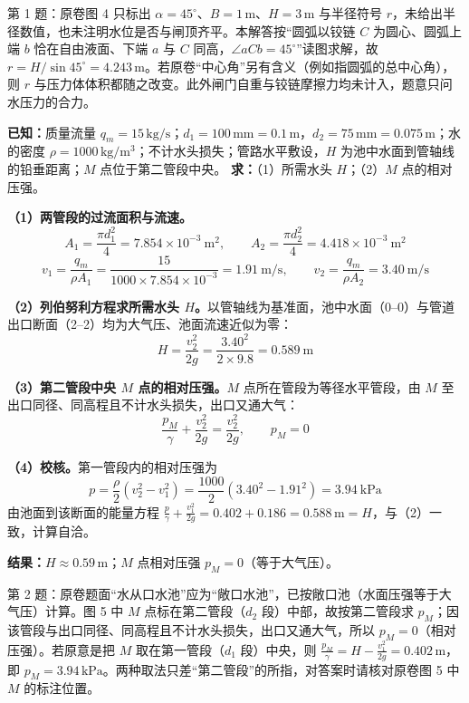 \begin{tishi}
第 1 题：原卷图 4 只标出 $\alpha=45^\circ$、$B=1\,\mathrm{m}$、$H=3\,\mathrm{m}$ 与半径符号 $r$，未给出半径数值，也未注明水位是否与闸顶齐平。本解答按“圆弧以铰链 $C$ 为圆心、圆弧上端 $b$ 恰在自由液面、下端 $a$ 与 $C$ 同高，$\angle aCb=45^\circ$”读图求解，故 $r=H/\sin45^\circ=4.243\,\mathrm{m}$。若原卷“中心角”另有含义（例如指圆弧的总中心角），则 $r$ 与压力体体积都随之改变。此外闸门自重与铰链摩擦力均未计入，题意只问水压力的合力。
\end{tishi}


\begin{jie}
\textbf{已知：}质量流量 $q_m=15\,\mathrm{kg/s}$；$d_1=100\,\mathrm{mm}=0.1\,\mathrm{m}$，$d_2=75\,\mathrm{mm}=0.075\,\mathrm{m}$；水的密度 $\rho=1000\,\mathrm{kg/m^3}$；不计水头损失；管路水平敷设，$H$ 为池中水面到管轴线的铅垂距离；$M$ 点位于第二管段中央。
\textbf{求：}（1）所需水头 $H$；（2）$M$ 点的相对压强。

\textbf{（1）两管段的过流面积与流速。}
\[
A_1=\frac{\pi d_1^2}{4}=7.854\times10^{-3}\ \mathrm{m^2},\qquad A_2=\frac{\pi d_2^2}{4}=4.418\times10^{-3}\ \mathrm{m^2}
\]
\[
v_1=\frac{q_m}{\rho A_1}=\frac{15}{1000\times7.854\times10^{-3}}=1.91\ \mathrm{m/s},\qquad v_2=\frac{q_m}{\rho A_2}=3.40\ \mathrm{m/s}
\]

\textbf{（2）列伯努利方程求所需水头 $H$。}以管轴线为基准面，池中水面（0--0）与管道出口断面（2--2）均为大气压、池面流速近似为零：
\[
H=\frac{v_2^2}{2g}=\frac{3.40^2}{2\times9.8}=0.589\ \mathrm{m}
\]

\textbf{（3）第二管段中央 $M$ 点的相对压强。}$M$ 点所在管段为等径水平管段，由 $M$ 至出口同径、同高程且不计水头损失，出口又通大气：
\[
\frac{p_M}{\gamma}+\frac{v_2^2}{2g}=\frac{v_2^2}{2g},\qquad p_M=0
\]

\textbf{（4）校核。}第一管段内的相对压强为
\[
p=\frac{\rho}{2}\left(v_2^2-v_1^2\right)=\frac{1000}{2}\left(3.40^2-1.91^2\right)=3.94\ \mathrm{kPa}
\]
由池面到该断面的能量方程 $\frac{p}{\gamma}+\frac{v_1^2}{2g}=0.402+0.186=0.588\,\mathrm{m}=H$，与（2）一致，计算自洽。

\textbf{结果：}$H\approx0.59\,\mathrm{m}$；$M$ 点相对压强 $p_M=0$（等于大气压）。
\end{jie}

\begin{tishi}
第 2 题：原卷题面“水从口水池”应为“敞口水池”，已按敞口池（水面压强等于大气压）计算。图 5 中 $M$ 点标在第二管段（$d_2$ 段）中部，故按第二管段求 $p_M$；因该管段与出口同径、同高程且不计水头损失，出口又通大气，所以 $p_M=0$（相对压强）。若原意是把 $M$ 取在第一管段（$d_1$ 段）中央，则 $\frac{p_M}{\gamma}=H-\frac{v_1^2}{2g}=0.402\,\mathrm{m}$，即 $p_M=3.94\,\mathrm{kPa}$。两种取法只差“第二管段”的所指，对答案时请核对原卷图 5 中 $M$ 的标注位置。
\end{tishi}

